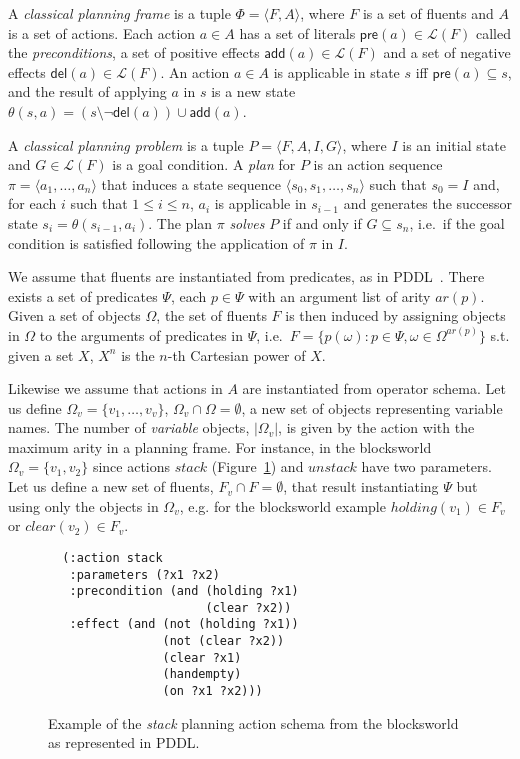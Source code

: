 \documentclass[letterpaper]{article} %
\newcommand{\tup}[1]{{\langle #1 \rangle}}
\newcommand{\pre}{\mathsf{pre}}     %
\newcommand{\del}{\mathsf{del}}     %
\newcommand{\add}{\mathsf{add}}     %
\begin{document}
A {\em classical planning frame} is a tuple $\Phi=\tup{F,A}$, where $F$ is a set of fluents and $A$ is a set of actions. Each action $a\in A$ has a set of literals $\pre(a)\in\mathcal{L}(F)$ called the {\em preconditions}, a set of positive effects $\add(a)\in\mathcal{L}(F)$ and a set of negative effects $\del(a)\in\mathcal{L}(F)$. An action $a\in A$ is applicable in state $s$ iff $\pre(a)\subseteq s$, and the result of applying $a$ in $s$ is a new state $\theta(s,a)=(s\setminus \neg\del(a))\cup\add(a)$.

A {\em classical planning problem} is a tuple $P=\tup{F,A,I,G}$, where $I$ is an initial state and $G\in\mathcal{L}(F)$ is a goal condition. A {\em plan} for $P$ is an action sequence $\pi=\tup{a_1, \ldots, a_n}$ that induces a state sequence $\tup{s_0, s_1, \ldots, s_n}$ such that $s_0=I$ and, for each $i$ such that {\small $1\leq i\leq n$}, $a_i$ is applicable in $s_{i-1}$ and generates the successor state $s_i=\theta(s_{i-1},a_i)$. The plan $\pi$ {\em solves} $P$ if and only if $G\subseteq s_n$, i.e.~if the goal condition is satisfied following the application of $\pi$ in $I$.

We assume that fluents are instantiated from predicates, as in PDDL~\cite{fox2003pddl2}. There exists a set of predicates $\Psi$, each $p\in\Psi$ with an argument list of arity $ar(p)$. Given a set of objects $\Omega$, the set of fluents $F$ is then induced by assigning objects in $\Omega$ to the arguments of predicates in $\Psi$, i.e.~$F=\{p(\omega):p\in\Psi,\omega\in\Omega^{ar(p)}\}$ s.t. given a set $X$, $X^n$ is the $n$-th Cartesian power of $X$.

Likewise we assume that actions in $A$ are instantiated from operator schema. Let us define $\Omega_v=\{v_1,\ldots,v_v\}$, $\Omega_v\cap\Omega=\emptyset$, a new set of objects representing variable names. The number of {\em variable} objects, $|\Omega_v|$, is given by the action with the maximum arity in a planning frame. For instance, in the blocksworld $\Omega_v=\{v_1,v_2\}$ since actions $stack$ (Figure~\ref{fig:stack}) and $unstack$ have two parameters. Let us define a new set of fluents, $F_{v}\cap F=\emptyset$, that result instantiating $\Psi$ but using only the objects in $\Omega_v$, e.g. for the blocksworld example $holding(v_1)\in F_v$ or $clear(v_2)\in F_v$.

\begin{figure}[hbt]
\begin{footnotesize}
\begin{verbatim}
  (:action stack
   :parameters (?x1 ?x2)
   :precondition (and (holding ?x1) 
                      (clear ?x2))
   :effect (and (not (holding ?x1))
                (not (clear ?x2))
                (clear ?x1)
                (handempty)
                (on ?x1 ?x2)))
\end{verbatim}
\end{footnotesize}
 \caption{\small Example of the {\em stack} planning action schema from the blocksworld as represented in PDDL.}
\label{fig:stack}
\end{figure}
\end{document}
